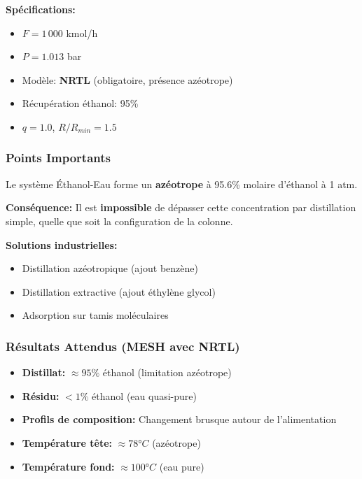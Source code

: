 \documentclass[11pt,a4paper]{article}
\begin{document}
\textbf{Spécifications:}
\begin{itemize}[leftmargin=*]
    \item $F = 1\,000$ kmol/h
    \item $P = 1.013$ bar
    \item Modèle: \textbf{NRTL} (obligatoire, présence azéotrope)
    \item Récupération éthanol: 95\%
    \item $q = 1.0$, $R/R_{min} = 1.5$
\end{itemize}

\subsubsection{Points Importants}

\begin{tcolorbox}[colback=red!10,colframe=red!50!black,title=⚠ Limitation Azéotropique]
Le système Éthanol-Eau forme un \textbf{azéotrope} à 95.6\% molaire d'éthanol à 1 atm.

\textbf{Conséquence:} Il est \textbf{impossible} de dépasser cette concentration par distillation simple, quelle que soit la configuration de la colonne.

\textbf{Solutions industrielles:}
\begin{itemize}[leftmargin=*]
    \item Distillation azéotropique (ajout benzène)
    \item Distillation extractive (ajout éthylène glycol)
    \item Adsorption sur tamis moléculaires
\end{itemize}
\end{tcolorbox}

\subsubsection{Résultats Attendus (MESH avec NRTL)}

\begin{itemize}[leftmargin=*]
    \item \textbf{Distillat:} $\approx 95\%$ éthanol (limitation azéotrope)
    \item \textbf{Résidu:} $< 1\%$ éthanol (eau quasi-pure)
    \item \textbf{Profils de composition:} Changement brusque autour de l'alimentation
    \item \textbf{Température tête:} $\approx 78°C$ (azéotrope)
    \item \textbf{Température fond:} $\approx 100°C$ (eau pure)
\end{itemize}
\end{document}
